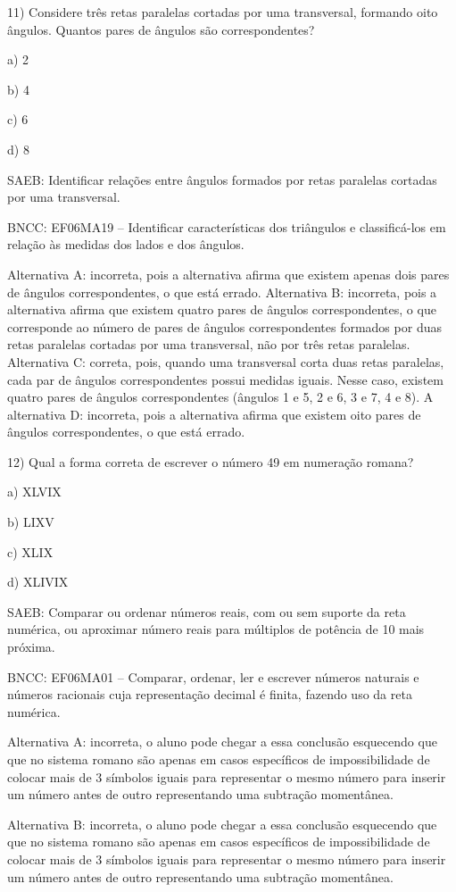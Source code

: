 11) Considere três retas paralelas cortadas por uma transversal,
formando oito ângulos. Quantos pares de ângulos são correspondentes?

a) 2

b) 4

c) 6

d) 8

SAEB: Identificar relações entre ângulos formados por retas paralelas
cortadas por uma transversal.

BNCC: EF06MA19 -- Identificar características dos triângulos e
classificá-los em relação às medidas dos lados e dos ângulos.

Alternativa A: incorreta, pois a alternativa afirma que existem apenas
dois pares de ângulos correspondentes, o que está errado. Alternativa B:
incorreta, pois a alternativa afirma que existem quatro pares de ângulos
correspondentes, o que corresponde ao número de pares de ângulos
correspondentes formados por duas retas paralelas cortadas por uma
transversal, não por três retas paralelas. Alternativa C: correta, pois,
quando uma transversal corta duas retas paralelas, cada par de ângulos
correspondentes possui medidas iguais. Nesse caso, existem quatro pares
de ângulos correspondentes (ângulos 1 e 5, 2 e 6, 3 e 7, 4 e 8). A
alternativa D: incorreta, pois a alternativa afirma que existem oito
pares de ângulos correspondentes, o que está errado.

12) Qual a forma correta de escrever o número 49 em numeração romana?

a) XLVIX

b) LIXV

c) XLIX

d) XLIVIX

SAEB: Comparar ou ordenar números reais, com ou sem suporte da reta
numérica, ou aproximar número reais para múltiplos de potência de 10
mais próxima.

BNCC: EF06MA01 -- Comparar, ordenar, ler e escrever números naturais e
números racionais cuja representação decimal é finita, fazendo uso da
reta numérica.

Alternativa A: incorreta, o aluno pode chegar a essa conclusão
esquecendo que que no sistema romano são apenas em casos específicos de
impossibilidade de colocar mais de 3 símbolos iguais para representar o
mesmo número para inserir um número antes de outro representando uma
subtração momentânea.

Alternativa B: incorreta, o aluno pode chegar a essa conclusão
esquecendo que que no sistema romano são apenas em casos específicos de
impossibilidade de colocar mais de 3 símbolos iguais para representar o
mesmo número para inserir um número antes de outro representando uma
subtração momentânea.

